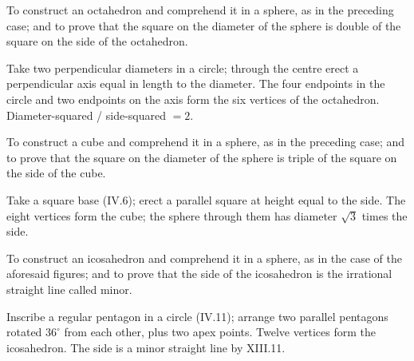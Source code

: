 \documentclass{rrxiv}
\begin{document}
\begin{claim}
\label{prop:XIII.14}
To construct an octahedron and comprehend it in a sphere, as in the
preceding case; and to prove that the square on the diameter of the
sphere is double of the square on the side of the octahedron.
\end{claim}
\begin{evidence}
\label{ev:XIII.14}
Take two perpendicular diameters in a circle; through the centre
erect a perpendicular axis equal in length to the diameter.  The
four endpoints in the circle and two endpoints on the axis form the
six vertices of the octahedron.  Diameter-squared / side-squared $= 2$.
\end{evidence}

\begin{claim}
\label{prop:XIII.15}
To construct a cube and comprehend it in a sphere, as in the
preceding case; and to prove that the square on the diameter of the
sphere is triple of the square on the side of the cube.
\end{claim}
\begin{evidence}
\label{ev:XIII.15}
Take a square base (IV.6); erect a parallel square at height equal
to the side.  The eight vertices form the cube; the sphere through
them has diameter $\sqrt{3}$ times the side.
\end{evidence}

\begin{claim}
\label{prop:XIII.16}
To construct an icosahedron and comprehend it in a sphere, as in the
case of the aforesaid figures; and to prove that the side of the
icosahedron is the irrational straight line called minor.
\end{claim}
\begin{evidence}
\label{ev:XIII.16}
Inscribe a regular pentagon in a circle (IV.11); arrange two parallel
pentagons rotated $36^\circ$ from each other, plus two apex points.
Twelve vertices form the icosahedron.  The side is a minor straight
line by XIII.11.
\end{evidence}
\end{document}
